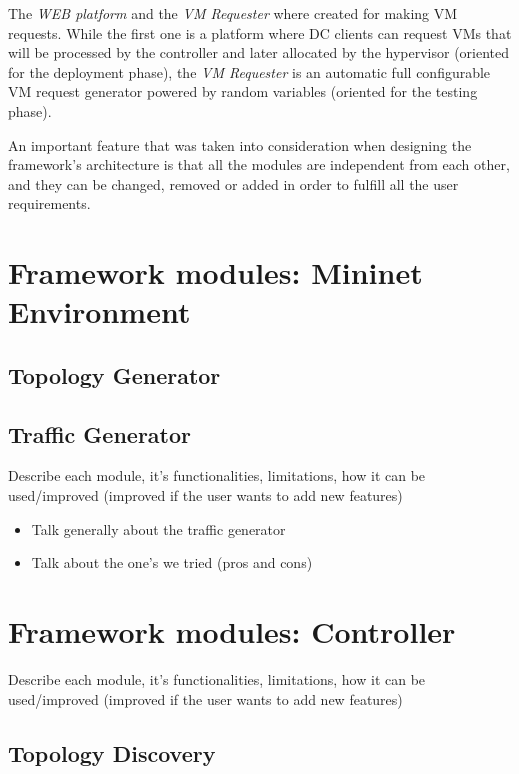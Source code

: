 \documentclass[12pt,english,oneside]{book}
\begin{document}
The {\it WEB platform} and the {\it VM Requester} where created for making VM requests. While the first one is a platform where DC clients can request VMs that will be processed by the controller and later allocated by the hypervisor (oriented for the deployment phase), the {\it VM Requester} is an automatic full configurable VM request generator powered by random variables (oriented for the testing phase).

An important feature that was taken into consideration when designing the framework's architecture is that all the modules are independent from each other, and they can be changed, removed or added in order to fulfill all the user requirements.

\section{Framework modules: Mininet Environment}

\subsection{Topology Generator}

\subsection{Traffic Generator}

Describe each module, it's functionalities, limitations, how it can be used/improved (improved if the user wants to add new features)

\begin{itemize}
	\item Talk generally about the traffic generator
	\item Talk about the one's we tried (pros and cons)
\end{itemize}

\newpage


\section{Framework modules: Controller}

Describe each module, it's functionalities, limitations, how it can be used/improved (improved if the user wants to add new features)

\subsection{Topology Discovery}
\end{document}

